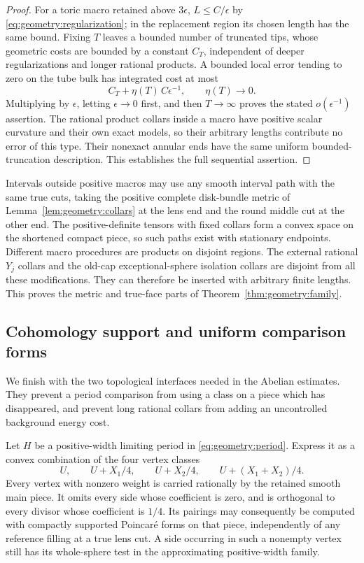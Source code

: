 \begin{proof}
For a toric macro retained above $3\epsilon$,
$L\le C/\epsilon$ by \eqref{eq:geometry:regularization};
in the replacement region its chosen length has the
same bound.  Fixing $T$ leaves a bounded number of
truncated tips, whose geometric costs are bounded by
a constant $C_T$, independent of deeper regularizations
and longer rational products.  A bounded local error
tending to zero on the tube bulk has integrated cost
at most
\begin{equation}
 C_T+\eta(T)\,C\epsilon^{-1},\qquad \eta(T)\longrightarrow0.
 \label{eq:geometry:integrated-error}
\end{equation}
Multiplying by $\epsilon$, letting $\epsilon\to0$ first,
and then $T\to\infty$ proves the stated
$o(\epsilon^{-1})$ assertion.  The rational product collars inside a macro
have positive scalar curvature and their own exact
models, so their arbitrary lengths contribute no error
of this type.  Their nonexact annular ends have the
same uniform bounded-truncation description.  This
establishes the full sequential assertion.
\end{proof}

Intervals outside positive macros may use any smooth interval
path with the same true cuts, taking the positive complete
disk-bundle metric of Lemma~\ref{lem:geometry:collars} at
the lens end and the round middle cut at the other end.
The positive-definite tensors with fixed collars form a
convex space on the shortened compact piece, so such paths
exist with stationary endpoints.  Different macro procedures
are products on disjoint regions.  The external rational
$Y_j$ collars and the old-cap exceptional-sphere isolation
collars are disjoint from all these modifications.  They
can therefore be inserted with arbitrary finite lengths.
This proves the metric and true-face parts of
Theorem~\ref{thm:geometry:family}.

\subsection{Cohomology support and uniform comparison forms}

We finish with the two topological interfaces needed in the
Abelian estimates.  They prevent a period comparison from
using a class on a piece which has disappeared, and prevent
long rational collars from adding an uncontrolled background
energy cost.

\begin{lemma}
\label{lem:geometry:period-support}
Let $H$ be a positive-width limiting period in
\eqref{eq:geometry:period}.  Express it as a convex
combination of the four vertex classes
\[
 U,\qquad U+X_1/4,\qquad U+X_2/4,
 \qquad U+(X_1+X_2)/4.
\]
Every vertex with nonzero weight is carried rationally by
the retained smooth main piece.  It omits every side whose
coefficient is zero, and is orthogonal to every divisor
whose coefficient is $1/4$.  Its pairings may consequently
be computed with compactly supported Poincar\'e forms on
that piece, independently of any reference filling at a
true lens cut.  A side occurring in such a nonempty vertex
still has its whole-sphere test in the approximating
positive-width family.
\end{lemma}

